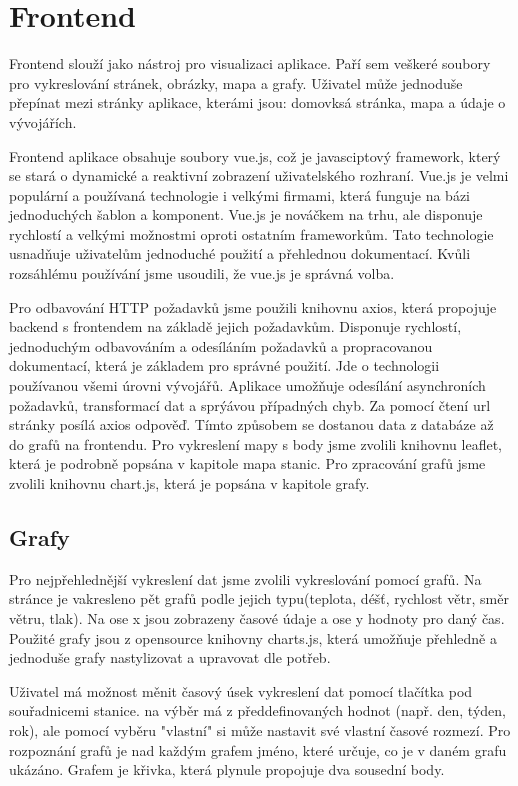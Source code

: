 \section{Frontend}
Frontend slouží jako nástroj pro visualizaci aplikace. Paří sem veškeré soubory pro vykreslování stránek, obrázky, mapa a grafy. Uživatel může jednoduše přepínat mezi stránky aplikace, kterámi jsou: domovksá stránka, mapa a údaje o vývojářích.

Frontend aplikace obsahuje soubory vue.js, což je javasciptový framework, který se stará o dynamické a reaktivní zobrazení uživatelského rozhraní. Vue.js je velmi populární a používaná technologie i velkými firmami, která funguje na bázi jednoduchých šablon a komponent.
Vue.js je nováčkem na trhu, ale disponuje rychlostí a velkými možnostmi oproti ostatním frameworkům.
Tato technologie usnadňuje uživatelům jednoduché použití a přehlednou dokumentací. Kvůli rozsáhlému používání jsme usoudili, že vue.js je správná volba. 

Pro odbavování HTTP požadavků jsme použili knihovnu axios, která propojuje backend s frontendem na základě jejich požadavkům. Disponuje rychlostí, jednoduchým odbavováním a odesíláním požadavků a propracovanou dokumentací, která je základem pro správné použití.
Jde o technologii používanou všemi úrovni vývojářů. Aplikace umožňuje odesílání asynchroních požadavků, transformací dat a sprýávou případných chyb.
Za pomocí čtení url stránky posílá axios odpověď. Tímto způsobem se dostanou data z databáze až do grafů na frontendu. 
Pro vykreslení mapy s body jsme zvolili knihovnu leaflet, která je podrobně popsána v kapitole mapa stanic. Pro zpracování grafů jsme zvolili knihovnu chart.js, která je popsána v kapitole grafy.

\subsection{Grafy}
Pro nejpřehlednější vykreslení dat jsme zvolili vykreslování pomocí grafů. Na stránce je vakresleno pět grafů podle jejich typu(teplota, déšť, rychlost větr, směr větru, tlak).
Na ose x jsou zobrazeny časové údaje a ose y hodnoty pro daný čas. Použité grafy jsou z opensource knihovny charts.js, která umožňuje přehledně a jednoduše grafy nastylizovat a upravovat dle potřeb.

Uživatel má možnost měnit časový úsek vykreslení dat pomocí tlačítka pod souřadnicemi stanice. na výběr má z předdefinovaných hodnot (např. den, týden, rok), ale pomocí vyběru "vlastní" si může nastavit své vlastní časové rozmezí.
Pro rozpoznání grafů je nad každým grafem jméno, které určuje, co je v daném grafu ukázáno. Grafem je křivka, která plynule propojuje dva sousední body.  


